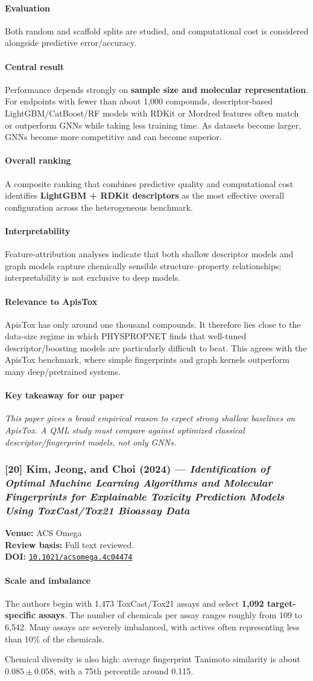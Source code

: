 \documentclass[11pt]{article}
\newcommand{\reviewfield}[2]{\paragraph{#1}#2}
\newcommand{\keytakeaway}[1]{\paragraph{Key takeaway for our paper}\emph{#1}}
\newcommand{\paperdoi}[1]{\href{https://doi.org/#1}{\texttt{#1}}}
\begin{document}
\reviewfield{Evaluation}{
Both random and scaffold splits are studied, and computational cost is considered alongside predictive error/accuracy.
}

\reviewfield{Central result}{
Performance depends strongly on \textbf{sample size and molecular representation}. For endpoints with fewer than about 1,000 compounds, descriptor-based LightGBM/CatBoost/RF models with RDKit or Mordred features often match or outperform GNNs while taking less training time. As datasets become larger, GNNs become more competitive and can become superior.
}

\reviewfield{Overall ranking}{
A composite ranking that combines predictive quality and computational cost identifies \textbf{LightGBM + RDKit descriptors} as the most effective overall configuration across the heterogeneous benchmark.
}

\reviewfield{Interpretability}{
Feature-attribution analyses indicate that both shallow descriptor models and graph models capture chemically sensible structure--property relationships; interpretability is not exclusive to deep models.
}

\reviewfield{Relevance to ApisTox}{
ApisTox has only around one thousand compounds. It therefore lies close to the data-size regime in which PHYSPROPNET finds that well-tuned descriptor/boosting models are particularly difficult to beat. This agrees with the ApisTox benchmark, where simple fingerprints and graph kernels outperform many deep/pretrained systems.
}

\keytakeaway{This paper gives a broad empirical reason to expect strong shallow baselines on ApisTox. A QML study must compare against optimized classical descriptor/fingerprint models, not only GNNs.}

\subsubsection{[20] Kim, Jeong, and Choi (2024) --- \textit{Identification of Optimal Machine Learning Algorithms and Molecular Fingerprints for Explainable Toxicity Prediction Models Using ToxCast/Tox21 Bioassay Data}}
\textbf{Venue:} ACS Omega\\
\textbf{Review basis:} Full text reviewed.\\
\textbf{DOI:} \paperdoi{10.1021/acsomega.4c04474}

\reviewfield{Scale and imbalance}{
The authors begin with 1,473 ToxCast/Tox21 assays and select \textbf{1,092 target-specific assays}. The number of chemicals per assay ranges roughly from 109 to 6,542. Many assays are severely imbalanced, with actives often representing less than 10\% of the chemicals.

Chemical diversity is also high: average fingerprint Tanimoto similarity is about $0.085\pm0.058$, with a 75th percentile around 0.115.
}
\end{document}
